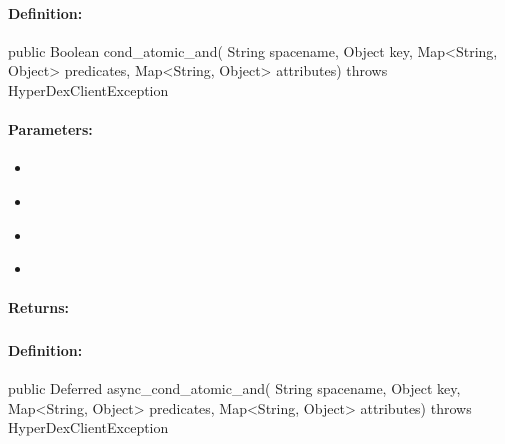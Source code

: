 \paragraph{Definition:}
\begin{javacode}
public Boolean cond_atomic_and(
        String spacename,
        Object key,
        Map<String, Object> predicates,
        Map<String, Object> attributes) throws HyperDexClientException
\end{javacode}

\paragraph{Parameters:}
\begin{itemize}[noitemsep]
\item {}\\

\item {}\\

\item {}\\

\item {}\\

\end{itemize}

\paragraph{Returns:}


\pagebreak
\subsubsection{}
\label{api:java:async_cond_atomic_and}


\paragraph{Definition:}
\begin{javacode}
public Deferred async_cond_atomic_and(
        String spacename,
        Object key,
        Map<String, Object> predicates,
        Map<String, Object> attributes) throws HyperDexClientException
\end{javacode}

